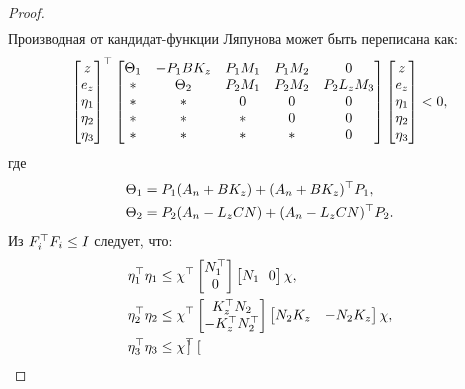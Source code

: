 \begin{proof}
\begin{align}
\end{align}
	Производная от кандидат-функции Ляпунова может быть переписана как:
	\begin{equation}
		\label{eq:thm3_after_Lyapunov}
		\begin{bmatrix}
			z \\ e_z \\ \eta_1 \\ \eta_2 \\ \eta_3
		\end{bmatrix}^\top
		\begin{bmatrix}
			{\Theta}_1 & -{P}_1{B}{K}_z & {P}_1{M}_1 & {P}_1{M}_2 &0 \\
			* &    {\Theta}_2 & {P}_2{M}_1 & {P}_2{M}_2 & {P}_2{L}_z{M}_3\\
			* & * & 0 & 0&0\\
			* & * & * & 0&0 \\
			* & * & * & *&0
		\end{bmatrix}
		\begin{bmatrix}
			z \\ e_z \\ \eta_1 \\ \eta_2 \\ \eta_3
		\end{bmatrix}<0,
	\end{equation}
	где
	\begin{align}
		{\Theta}_1&={P}_1({A}_n+{B}{K}_z)+({A}_n+{B}{K}_z)^\top{P}_1 ,\\
		{\Theta}_2&={P}_2({A}_n-{L}_z{CN})+({A}_n-{L}_z{CN})^\top{P}_2.
	\end{align}
	Из ${F}_i^\top{F}_i\leq {I}$ следует, что:
	\begin{align}    
		\label{eq:condition_Sproc}
		\eta_1^\top\eta_1 &\leq \chi^\top \begin{bmatrix}
			{N}_1^\top \\ 0  
		\end{bmatrix}\begin{bmatrix}
			{N}_1 \ \ 0  
		\end{bmatrix} \chi,
		\\
		\eta_2^\top\eta_2 &\leq \chi^\top \begin{bmatrix}
			{K}_z^\top{N}_2 \\ -{K}_z^\top{N}_2^\top  
		\end{bmatrix}\begin{bmatrix}
			{N}_2{K}_z & -{N}_2{K}_z
		\end{bmatrix} \chi,
		\\
		\eta_3^\top\eta_3 &\leq \chi^\top \begin{bmatrix}

\end{bmatrix}
\end{align}
\end{proof}
